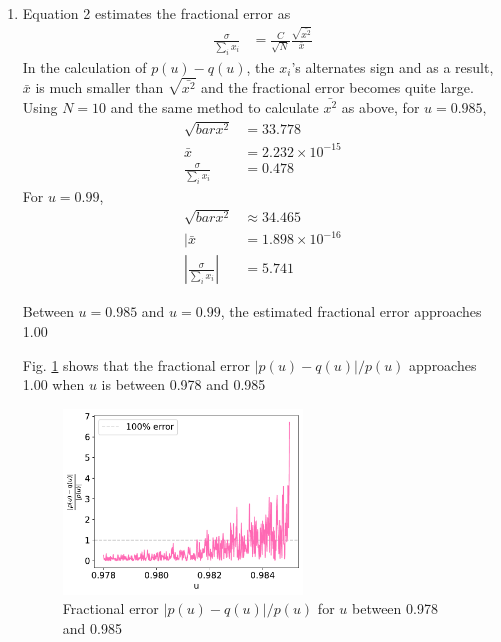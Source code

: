\documentclass{article}
\begin{document}
\begin{enumerate}
\begin{enumerate}
    \item Equation 2 estimates the fractional error as
    \begin{align*}
        \frac{\sigma}{\sum_i x_i} &= \frac{C}{\sqrt{N}}\frac{\sqrt{\bar{x^2}}}{\bar{x}}
    \end{align*}
    In the calculation of $p(u)-q(u)$, the $x_i$'s alternates sign and as a result, $\bar{x}$ is much smaller than $\sqrt{\bar{x^2}}$ and the fractional error becomes quite large. 
    Using $N=10$ and the same method to calculate $\bar{x^2}$ as above, for $u=0.985$,
    \begin{align*}
        \sqrt{bar{x^2}} &= 33.778\\
        \bar{x} &= 2.232\times 10^{-15}\\
        \frac{\sigma}{\sum_i x_i} &= 0.478
    \end{align*}
    For $u=0.99$,
    \begin{align*}
        \sqrt{bar{x^2}} &\approx 34.465\\
        |\bar{x}\ &= 1.898 \times 10^{-16}\\
        |\frac{\sigma}{\sum_i x_i}| &= 5.741
    \end{align*}

    Between $u=0.985$ and $u=0.99$, the estimated fractional error approaches 1.00

    Fig. \ref{fig:3c} shows that the fractional error $|p(u)-q(u)|/p(u)$ approaches 1.00 when $u$ is between 0.978 and 0.985

    \begin{figure}[h]
        \centering
        \includegraphics[width=0.6\textwidth]{3c.pdf}
        \caption{Fractional error $|p(u)-q(u)|/p(u)$ for $u$ between 0.978 and 0.985}
        \label{fig:3c}
    \end{figure}


\end{enumerate}
\end{enumerate}
\end{document}
